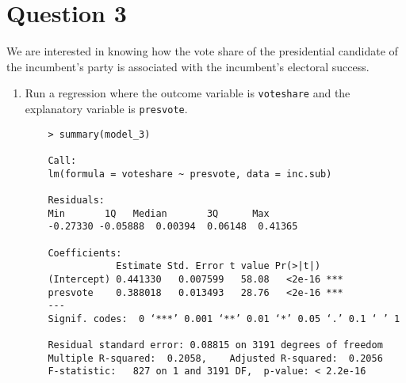 \documentclass[12pt,letterpaper]{article}
\begin{document}
	\newpage	
\section*{Question 3}

\noindent We are interested in knowing how the vote share of the presidential candidate of the incumbent's party is associated with the incumbent's electoral success.
	\vspace{.25cm}
	\begin{enumerate}
		\item Run a regression where the outcome variable is
		 \texttt{voteshare} and the explanatory variable is \texttt{presvote}.
		 
	\begin{Verbatim}
 	> summary(model_3)
 	
 	Call:
 	lm(formula = voteshare ~ presvote, data = inc.sub)
 	
 	Residuals:
 	Min       1Q   Median       3Q      Max 
 	-0.27330 -0.05888  0.00394  0.06148  0.41365 
 	
 	Coefficients:
 	            Estimate Std. Error t value Pr(>|t|)    
 	(Intercept) 0.441330   0.007599   58.08   <2e-16 ***
 	presvote    0.388018   0.013493   28.76   <2e-16 ***
 	---
 	Signif. codes:  0 ‘***’ 0.001 ‘**’ 0.01 ‘*’ 0.05 ‘.’ 0.1 ‘ ’ 1
 	
 	Residual standard error: 0.08815 on 3191 degrees of freedom
 	Multiple R-squared:  0.2058,	Adjusted R-squared:  0.2056 
 	F-statistic:   827 on 1 and 3191 DF,  p-value: < 2.2e-16
 	

\end{Verbatim}
\end{enumerate}
\end{document}
